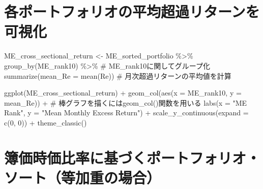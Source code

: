 \documentclass[
  letterpaper,
  DIV=11,
  numbers=noendperiod]{scrreprt}
\newenvironment{Shaded}{\begin{snugshade}}{\end{snugshade}}
\newcommand{\AttributeTok}[1]{\textcolor[rgb]{0.40,0.45,0.13}{#1}}
\newcommand{\CommentTok}[1]{\textcolor[rgb]{0.37,0.37,0.37}{#1}}
\newcommand{\DecValTok}[1]{\textcolor[rgb]{0.68,0.00,0.00}{#1}}
\newcommand{\FunctionTok}[1]{\textcolor[rgb]{0.28,0.35,0.67}{#1}}
\newcommand{\NormalTok}[1]{\textcolor[rgb]{0.00,0.23,0.31}{#1}}
\newcommand{\OtherTok}[1]{\textcolor[rgb]{0.00,0.23,0.31}{#1}}
\newcommand{\SpecialCharTok}[1]{\textcolor[rgb]{0.37,0.37,0.37}{#1}}
\newcommand{\StringTok}[1]{\textcolor[rgb]{0.13,0.47,0.30}{#1}}
\begin{document}
\section{各ポートフォリオの平均超過リターンを可視化}\label{ux5404ux30ddux30fcux30c8ux30d5ux30a9ux30eaux30aaux306eux5e73ux5747ux8d85ux904eux30eaux30bfux30fcux30f3ux3092ux53efux8996ux5316}

\begin{Shaded}
\begin{Highlighting}[]
\NormalTok{ME\_cross\_sectional\_return }\OtherTok{\textless{}{-}}\NormalTok{ ME\_sorted\_portfolio }\SpecialCharTok{\%\textgreater{}\%} 
  \FunctionTok{group\_by}\NormalTok{(ME\_rank10) }\SpecialCharTok{\%\textgreater{}\%} \CommentTok{\# ME\_rank10に関してグループ化}
  \FunctionTok{summarize}\NormalTok{(}\AttributeTok{mean\_Re =} \FunctionTok{mean}\NormalTok{(Re)) }\CommentTok{\# 月次超過リターンの平均値を計算}

\FunctionTok{ggplot}\NormalTok{(ME\_cross\_sectional\_return) }\SpecialCharTok{+} 
  \FunctionTok{geom\_col}\NormalTok{(}\FunctionTok{aes}\NormalTok{(}\AttributeTok{x =}\NormalTok{ ME\_rank10, }\AttributeTok{y =}\NormalTok{ mean\_Re)) }\SpecialCharTok{+} \CommentTok{\# 棒グラフを描くにはgeom\_col()関数を用いる}
  \FunctionTok{labs}\NormalTok{(}\AttributeTok{x =} \StringTok{"ME Rank"}\NormalTok{, }\AttributeTok{y =} \StringTok{"Mean Monthly Excess Return"}\NormalTok{) }\SpecialCharTok{+} 
  \FunctionTok{scale\_y\_continuous}\NormalTok{(}\AttributeTok{expand =} \FunctionTok{c}\NormalTok{(}\DecValTok{0}\NormalTok{, }\DecValTok{0}\NormalTok{)) }\SpecialCharTok{+} 
  \FunctionTok{theme\_classic}\NormalTok{()}
\end{Highlighting}
\end{Shaded}

\section{簿価時価比率に基づくポートフォリオ・ソート（等加重の場合）}\label{ux7c3fux4fa1ux6642ux4fa1ux6bd4ux7387ux306bux57faux3065ux304fux30ddux30fcux30c8ux30d5ux30a9ux30eaux30aaux30bdux30fcux30c8ux7b49ux52a0ux91cdux306eux5834ux5408}
\end{document}

